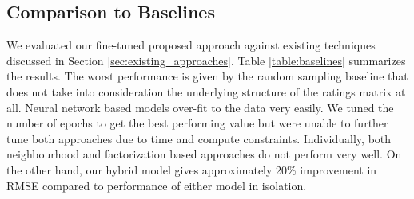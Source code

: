 \documentclass[10pt,conference,compsocconf]{IEEEtran}
\begin{document}
\begin{table}[H]
\centering
{}\caption{Validation and Test rmse for different cf techniques}\label{table:baselines}
\end{table}

\subsection{Comparison to Baselines}
We evaluated our fine-tuned proposed approach against existing techniques discussed in Section \ref{sec:existing_approaches}. Table \ref{table:baselines} summarizes the results. The worst performance is given by the random sampling baseline that does not take into consideration the underlying structure of the ratings matrix at all. Neural network based models over-fit to the data very easily. We tuned the number of epochs to get the best performing value but were unable to further tune both approaches due to time and compute constraints. Individually, both neighbourhood and factorization based approaches do not perform very well. On the other hand, our hybrid model gives approximately 20\% improvement in RMSE compared to performance of either model in isolation.
\end{document}
